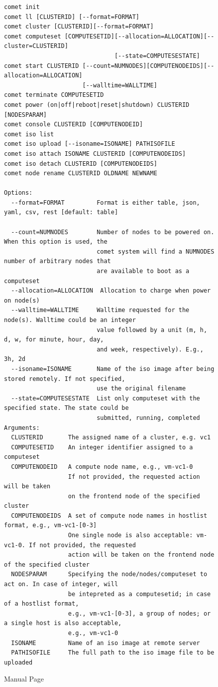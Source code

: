 \begin{figure}[htb]
\begin{tiny}
\begin{verbatim}
comet init
comet ll [CLUSTERID] [--format=FORMAT]
comet cluster [CLUSTERID][--format=FORMAT]
comet computeset [COMPUTESETID][--allocation=ALLOCATION][--cluster=CLUSTERID] 
                               [--state=COMPUTESESTATE]
comet start CLUSTERID [--count=NUMNODES][COMPUTENODEIDS][--allocation=ALLOCATION]
                      [--walltime=WALLTIME]
comet terminate COMPUTESETID
comet power (on|off|reboot|reset|shutdown) CLUSTERID [NODESPARAM]
comet console CLUSTERID [COMPUTENODEID]
comet iso list
comet iso upload [--isoname=ISONAME] PATHISOFILE
comet iso attach ISONAME CLUSTERID [COMPUTENODEIDS]
comet iso detach CLUSTERID [COMPUTENODEIDS]
comet node rename CLUSTERID OLDNAME NEWNAME

Options:
  --format=FORMAT         Format is either table, json, yaml, csv, rest [default: table]
                            
  --count=NUMNODES        Number of nodes to be powered on. When this option is used, the 
                          comet system will find a NUMNODES number of arbitrary nodes that 
                          are available to boot as a computeset
  --allocation=ALLOCATION  Allocation to charge when power on node(s)
  --walltime=WALLTIME     Walltime requested for the node(s). Walltime could be an integer 
                          value followed by a unit (m, h, d, w, for minute, hour, day,
                          and week, respectively). E.g., 3h, 2d
  --isoname=ISONAME       Name of the iso image after being stored remotely. If not specified, 
                          use the original filename
  --state=COMPUTESESTATE  List only computeset with the specified state. The state could be 
                          submitted, running, completed
Arguments:
  CLUSTERID       The assigned name of a cluster, e.g. vc1
  COMPUTESETID    An integer identifier assigned to a computeset
  COMPUTENODEID   A compute node name, e.g., vm-vc1-0
                  If not provided, the requested action will be taken
                  on the frontend node of the specified cluster
  COMPUTENODEIDS  A set of compute node names in hostlist format, e.g., vm-vc1-[0-3]
                  One single node is also acceptable: vm-vc1-0. If not provided, the requested 
                  action will be taken on the frontend node of the specified cluster
  NODESPARAM      Specifying the node/nodes/computeset to act on. In case of integer, will 
                  be intepreted as a computesetid; in case of a hostlist format, 
                  e.g., vm-vc1-[0-3], a group of nodes; or a single host is also acceptable,
                  e.g., vm-vc1-0
  ISONAME         Name of an iso image at remote server
  PATHISOFILE     The full path to the iso image file to be uploaded
\end{verbatim}
\end{tiny}
\caption{Manual Page}\label{F:man}
\end{figure}


